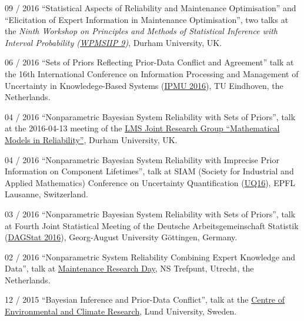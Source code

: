 \documentclass[a4paper]{simplecv}
\begin{document}
\begin{topic}
\item[09 / 2016] ``Statistical Aspects of Reliability and Maintenance Optimisation'' and
                 ``Elicitation of Expert Information in Maintenance Optimisation'', two talks at the %
                 \emph{Ninth Workshop on Principles and Methods of Statistical Inference with Interval Probability (\href{http://www.maths.dur.ac.uk/users/matthias.troffaes/wpmsiip2016/index.html}{WPMSIIP 9})}, Durham University, UK.

\item[06 / 2016] ``Sets of Priors Reflecting Prior-Data Conflict and Agreement'' talk at %
                 the 16th International Conference on Information Processing and Management of Uncertainty in Knowledege-Based Systems
                 (\href{http://ipmu2016.org/}{IPMU 2016}), TU Eindhoven, the Netherlands.

\item[04 / 2016] ``Nonparametric Bayesian System Reliability with Sets of Priors'', talk at the %
                 2016-04-13 meeting of the \href{http://maths.dur.ac.uk/stats/people/fc/LMS-Reliability.html}{LMS Joint Research Group ``Mathematical Models in Reliability''}, Durham University, UK.

\item[04 / 2016] ``Nonparametric Bayesian System Reliability with Imprecise Prior Information on Component Lifetimes'', talk at %
                 SIAM (Society for Industrial and Applied Mathematics) Conference on Uncertainty Quantification
                 (\href{http://www.siam.org/meetings/uq16/index.php}{UQ16}),
                 EPFL Lausanne, Switzerland.

\item[03 / 2016] ``Nonparametric Bayesian System Reliability with Sets of Priors'', talk at %
                 Fourth Joint Statistical Meeting of the Deutsche Arbeitsgemeinschaft Statistik
                 (\href{http://www.uni-goettingen.de/dagstat2016}{DAGStat 2016}),
                 Georg-August University G\"{o}ttingen, Germany.

\item[02 / 2016] ``Nonparametric System Reliability Combining Expert Knowledge and Data'', talk at %
                 \href{http://www.maintenanceresearch.nl/}{Maintenance Research Day}, NS Trefpunt, Utrecht, the Netherlands.

\item[12 / 2015] ``Bayesian Inference and Prior-Data Conflict'', talk at %
                 the \href{http://www.cec.lu.se/}{Centre of Environmental and Climate Research},
                 Lund University, Sweden.


\end{topic}
\end{document}
